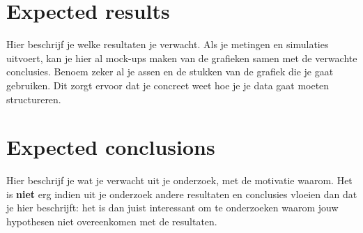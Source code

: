 \documentclass[fleqn,10pt]{voorstel}
\begin{document}

\section{Expected results}
\label{sec:expected_results}

Hier beschrijf je welke resultaten je verwacht. Als je metingen en simulaties uitvoert, kan je hier al mock-ups maken van de grafieken samen met de verwachte conclusies. Benoem zeker al je assen en de stukken van de grafiek die je gaat gebruiken. Dit zorgt ervoor dat je concreet weet hoe je je data gaat moeten structureren.


\section{Expected conclusions}
\label{sec:expected_conclusions}

Hier beschrijf je wat je verwacht uit je onderzoek, met de motivatie waarom. Het is \textbf{niet} erg indien uit je onderzoek andere resultaten en conclusies vloeien dan dat je hier beschrijft: het is dan juist interessant om te onderzoeken waarom jouw hypothesen niet overeenkomen met de resultaten.


\printbibliography[heading=bibintoc]
\end{document}
